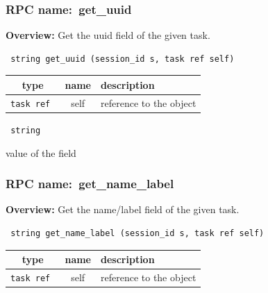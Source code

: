 \subsubsection{RPC name:~get\_uuid}

{\bf Overview:} 
Get the uuid field of the given task.

\begin{verbatim} string get_uuid (session_id s, task ref self)\end{verbatim}



 
\vspace{0.3cm}
\begin{tabular}{|c|c|p{7cm}|}
 \hline
{\bf type} & {\bf name} & {\bf description} \\ \hline
{\tt task ref } & self & reference to the object \\ \hline 

\end{tabular}

\vspace{0.3cm}

{\tt 
string
}


value of the field
\vspace{0.3cm}
\vspace{0.3cm}
\vspace{0.3cm}
\subsubsection{RPC name:~get\_name\_label}

{\bf Overview:} 
Get the name/label field of the given task.

\begin{verbatim} string get_name_label (session_id s, task ref self)\end{verbatim}



 
\vspace{0.3cm}
\begin{tabular}{|c|c|p{7cm}|}
 \hline
{\bf type} & {\bf name} & {\bf description} \\ \hline
{\tt task ref } & self & reference to the object \\ \hline 

\end{tabular}

\vspace{0.3cm}

